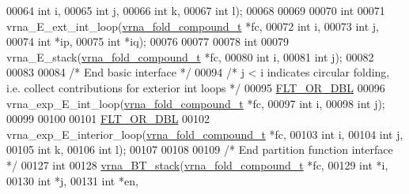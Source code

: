 \begin{DoxyCode}
00064                    \textcolor{keywordtype}{int}                  i,
00065                    \textcolor{keywordtype}{int}                  j,
00066                    \textcolor{keywordtype}{int}                  k,
00067                    \textcolor{keywordtype}{int}                  l);
00068 
00069 
00070 \textcolor{keywordtype}{int}
00071 vrna\_E\_ext\_int\_loop(\hyperlink{group__fold__compound_structvrna__fc__s}{vrna\_fold\_compound\_t}  *fc,
00072                     \textcolor{keywordtype}{int}                   i,
00073                     \textcolor{keywordtype}{int}                   j,
00074                     \textcolor{keywordtype}{int}                   *ip,
00075                     \textcolor{keywordtype}{int}                   *iq);
00076 
00077 
00078 \textcolor{keywordtype}{int}
00079 vrna\_E\_stack(\hyperlink{group__fold__compound_structvrna__fc__s}{vrna\_fold\_compound\_t} *fc,
00080              \textcolor{keywordtype}{int}                  i,
00081              \textcolor{keywordtype}{int}                  j);
00082 
00083 
00084 \textcolor{comment}{/* End basic interface */}
00094 \textcolor{comment}{/* j < i indicates circular folding, i.e. collect contributions for exterior int loops */}
00095 \hyperlink{group__data__structures_ga31125aeace516926bf7f251f759b6126}{FLT\_OR\_DBL}
00096 vrna\_exp\_E\_int\_loop(\hyperlink{group__fold__compound_structvrna__fc__s}{vrna\_fold\_compound\_t}  *fc,
00097                     \textcolor{keywordtype}{int}                   i,
00098                     \textcolor{keywordtype}{int}                   j);
00099 
00100 
00101 \hyperlink{group__data__structures_ga31125aeace516926bf7f251f759b6126}{FLT\_OR\_DBL}
00102 vrna\_exp\_E\_interior\_loop(\hyperlink{group__fold__compound_structvrna__fc__s}{vrna\_fold\_compound\_t} *fc,
00103                          \textcolor{keywordtype}{int}                  i,
00104                          \textcolor{keywordtype}{int}                  j,
00105                          \textcolor{keywordtype}{int}                  k,
00106                          \textcolor{keywordtype}{int}                  l);
00107 
00108 
00109 \textcolor{comment}{/* End partition function interface */}
00127 \textcolor{keywordtype}{int}
00128 \hyperlink{group__mfe__backtracking_ga28015cfbd0afc759b94ff58cc241cb13}{vrna\_BT\_stack}(\hyperlink{group__fold__compound_structvrna__fc__s}{vrna\_fold\_compound\_t}  *fc,
00129               \textcolor{keywordtype}{int}                   *i,
00130               \textcolor{keywordtype}{int}                   *j,
00131               \textcolor{keywordtype}{int}                   *en,

\end{DoxyCode}
